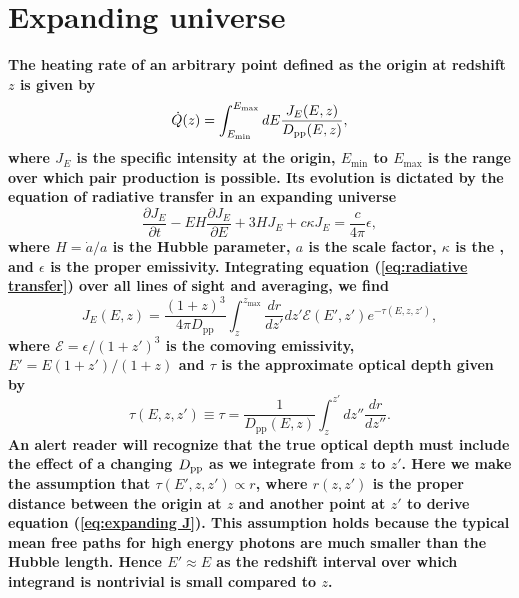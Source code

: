 \documentclass[numberedappendix]{emulateapj}
\newcommand\Pc[1]{{\color{cyan} \bf #1}} %
\begin{document}
\section{Expanding universe}\label{sec:window_exp}

\Pc{The heating rate of an arbitrary point defined as the origin at redshift $z$ is given by 
\begin{equation}
  \dot{Q}(z)= \int_{E_{\rm min}}^{E_{\rm max}} dE \frac{J_E(E, z)}{D_{\mathrm{pp}}(E, z)},
\end{equation}
where $J_E$ is the specific intensity at the origin, $E_{\mathrm{min}}$ to $E_{\mathrm{max}}$ is the range over which pair production is possible. Its evolution is dictated by the equation of radiative transfer in an expanding universe
\begin{equation}\label{eq:radiative transfer}
  \frac{\partial J_E}{\partial t} - E H \frac{\partial J_E}{\partial E} + 3 H J_E + c\kappa J_E  = \frac {c}{4\pi} \epsilon,
\end{equation}
where $H = \dot{a}/a$ is the Hubble parameter, $a$ is the scale factor, $\kappa$ is the , and $\epsilon$ is the proper emissivity.  Integrating equation (\ref{eq:radiative transfer}) over all lines of sight and averaging, we find 
\begin{equation}\label{eq:expanding J}
  J_E(E, z) = \frac {(1 + z)^3} {4\pi D_{\mathrm{pp}}} \int_z^{z_{\mathrm{max}}} \frac{dr}{dz'} dz' {\mathcal{E}(E',z')}e^{-\tau(E,z,z')},
\end{equation}
where $\mathcal{E} = \epsilon/(1+z')^3$ is the comoving emissivity, $E' = E (1+z')/(1+z)$ and $\tau$ is the approximate optical depth given by
\begin{equation}
\label{eq:tau}
\tau(E,z,z')\equiv \tau=\frac{1}{D_{\mathrm{pp}}(E,z)}\int_z^{z'}dz''\frac{dr}{dz''}.%
\end{equation}
An alert reader will recognize that the true optical depth must include the effect of a changing $D_{\rm pp}$ as we integrate from $z$ to $z'$.  Here we make the assumption that $\tau(E',z,z') \propto r$, where $r(z,z')$ is the proper distance between the origin at $z$ and another point at $z'$ to 
derive equation (\ref{eq:expanding J}). This assumption holds because the typical mean free paths for high energy photons are much smaller than the Hubble length.  Hence $E' \approx E$ as the redshift interval over which integrand is nontrivial is small compared to $z$.  
}
\end{document}
